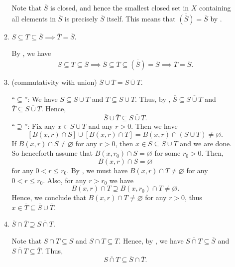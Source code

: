 \begin{enumerate}
\begin{enumerate}
\begin{pf}
Note that \(\overline{S}\) is closed, and hence the smallest closed set in
\(X\) containing all elements in \(\overline{S}\) is precisely \(\overline{S}\)
itself. This means that \(\overline{(\overline{S})}=\overline{S}\) by
.
\end{pf}
\item \(S\subseteq T\subseteq \overline{S}\implies \overline{T}=\overline{S}\).

\begin{pf}
By , we have
\[
S\subseteq T\subseteq \overline{S}
\implies
\overline{S}\subseteq \overline{T}\subseteq \overline{(\overline{S})}=\overline{S}
\implies
\overline{T}=\overline{S}.
\]
\end{pf}
\item (commutativity with union) \(\overline{S}\cup\overline{T}=\overline{S\cup T}\).

\begin{pf}
``\(\subseteq\)'':  We have \(S\subseteq S\cup T\) and \(T\subseteq S\cup T\).
Thus, by , \(\overline{S}\subseteq
\overline{S\cup T}\) and \(\overline{T}\subseteq \overline{S\cup T}\). Hence,
\[
\overline{S}\cup\overline{T}\subseteq \overline{S\cup T}.
\]
``\(\supseteq\)'': Fix any \(x\in\overline{S\cup T}\) and any \(r>0\). Then we
have
\begin{equation}
\label{eq:clos-union-rev-subs}
[B(x,r)\cap S]\cup[B(x,r)\cap T]=B(x,r)\cap(S\cup T)\ne\varnothing.
\end{equation}
If \(B(x,r)\cap S\ne\varnothing\) for any \(r>0\), then
\(x\in\overline{S}\subseteq \overline{S}\cup\overline{T}\) and we are done.
So henceforth assume that \(B(x,r_0)\cap S=\varnothing\) for some \(r_0>0\). Then,
\[
B(x,r)\cap S=\varnothing
\]
for any \(0<r\le r_0\). By , we must have
\(B(x,r)\cap T\ne\varnothing\) for any \(0<r\le r_0\). Also, for any \(r>r_0\)
we have
\[
B(x,r)\cap T\supseteq B(x,r_0)\cap T\ne\varnothing.
\]
Hence, we conclude that \(B(x,r)\cap T\ne\varnothing\) for any \(r>0\), thus
\(x\in\overline{T}\subseteq \overline{S}\cup\overline{T}\).
\end{pf}
\item \(\overline{S}\cap\overline{T}\supseteq\overline{S\cap T}\).

\begin{pf}
Note that \(S\cap T\subseteq S\) and \(S\cap T\subseteq T\). Hence, by
, we have \(\overline{S\cap T}\subseteq
\overline{S}\) and \(\overline{S\cap T}\subseteq \overline{T}\). Thus,
\[
\overline{S\cap T}\subseteq \overline{S}\cap\overline{T}.
\]
\end{pf}


\end{enumerate}
\end{enumerate}
